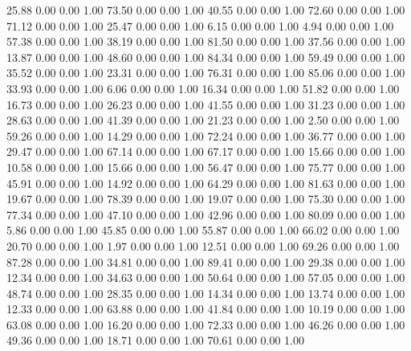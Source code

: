    25.88   0.00   0.00   1.00
   73.50   0.00   0.00   1.00
   40.55   0.00   0.00   1.00
   72.60   0.00   0.00   1.00
   71.12   0.00   0.00   1.00
   25.47   0.00   0.00   1.00
    6.15   0.00   0.00   1.00
    4.94   0.00   0.00   1.00
   57.38   0.00   0.00   1.00
   38.19   0.00   0.00   1.00
   81.50   0.00   0.00   1.00
   37.56   0.00   0.00   1.00
   13.87   0.00   0.00   1.00
   48.60   0.00   0.00   1.00
   84.34   0.00   0.00   1.00
   59.49   0.00   0.00   1.00
   35.52   0.00   0.00   1.00
   23.31   0.00   0.00   1.00
   76.31   0.00   0.00   1.00
   85.06   0.00   0.00   1.00
   33.93   0.00   0.00   1.00
    6.06   0.00   0.00   1.00
   16.34   0.00   0.00   1.00
   51.82   0.00   0.00   1.00
   16.73   0.00   0.00   1.00
   26.23   0.00   0.00   1.00
   41.55   0.00   0.00   1.00
   31.23   0.00   0.00   1.00
   28.63   0.00   0.00   1.00
   41.39   0.00   0.00   1.00
   21.23   0.00   0.00   1.00
    2.50   0.00   0.00   1.00
   59.26   0.00   0.00   1.00
   14.29   0.00   0.00   1.00
   72.24   0.00   0.00   1.00
   36.77   0.00   0.00   1.00
   29.47   0.00   0.00   1.00
   67.14   0.00   0.00   1.00
   67.17   0.00   0.00   1.00
   15.66   0.00   0.00   1.00
   10.58   0.00   0.00   1.00
   15.66   0.00   0.00   1.00
   56.47   0.00   0.00   1.00
   75.77   0.00   0.00   1.00
   45.91   0.00   0.00   1.00
   14.92   0.00   0.00   1.00
   64.29   0.00   0.00   1.00
   81.63   0.00   0.00   1.00
   19.67   0.00   0.00   1.00
   78.39   0.00   0.00   1.00
   19.07   0.00   0.00   1.00
   75.30   0.00   0.00   1.00
   77.34   0.00   0.00   1.00
   47.10   0.00   0.00   1.00
   42.96   0.00   0.00   1.00
   80.09   0.00   0.00   1.00
    5.86   0.00   0.00   1.00
   45.85   0.00   0.00   1.00
   55.87   0.00   0.00   1.00
   66.02   0.00   0.00   1.00
   20.70   0.00   0.00   1.00
    1.97   0.00   0.00   1.00
   12.51   0.00   0.00   1.00
   69.26   0.00   0.00   1.00
   87.28   0.00   0.00   1.00
   34.81   0.00   0.00   1.00
   89.41   0.00   0.00   1.00
   29.38   0.00   0.00   1.00
   12.34   0.00   0.00   1.00
   34.63   0.00   0.00   1.00
   50.64   0.00   0.00   1.00
   57.05   0.00   0.00   1.00
   48.74   0.00   0.00   1.00
   28.35   0.00   0.00   1.00
   14.34   0.00   0.00   1.00
   13.74   0.00   0.00   1.00
   12.33   0.00   0.00   1.00
   63.88   0.00   0.00   1.00
   41.84   0.00   0.00   1.00
   10.19   0.00   0.00   1.00
   63.08   0.00   0.00   1.00
   16.20   0.00   0.00   1.00
   72.33   0.00   0.00   1.00
   46.26   0.00   0.00   1.00
   49.36   0.00   0.00   1.00
   18.71   0.00   0.00   1.00
   70.61   0.00   0.00   1.00
